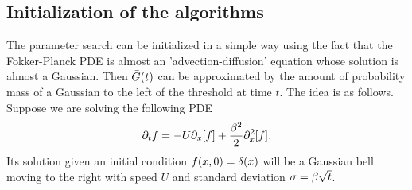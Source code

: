\subsection{Initialization of the algorithms}
The parameter search can be initialized in a simple way using the fact that
the Fokker-Planck PDE is almost an 'advection-diffusion' equation whose solution is
almost a Gaussian. Then ${ \bar{G} }(t)$ can be approximated by the
amount of probability mass of a Gaussian to the left of the threshold at time $t$. The
idea is as follows. Suppose we are solving the following PDE
\begin{equation}
{\partial}_t {f} = -U {\partial}_x [{f}] + \frac{\beta^2}{2} {\partial}^2_x [{f}].
\label{eq:FP_pde}
\end{equation}
Its solution given an initial condition ${f}(x,0) = \delta(x)$ will be a 
Gaussian bell moving to the right with speed $U$ and standard deviation $\sigma =
\beta\sqrt{t}$.

